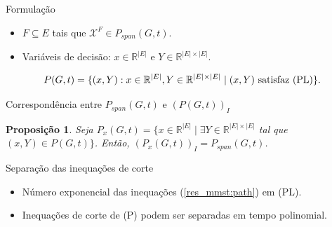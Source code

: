 \documentclass[dvipsnames]{beamer}
\newtheorem{proposicao}{Proposição}
\newcommand{\incid}{\mathcal{X}}
\newcommand{\espacoX}{\mathbb{R}^{|E|}}
\newcommand{\espacoY}{\mathbb{R}^{|E| \times |E|}}
\newcommand{\PGtrestricoes}{\rm{(PL)}}
\begin{document}
\begin{frame}{Formulação}
  \begin{itemize}
  \item $F\subseteq E$ tais que $\incid^{F} \in P_{span}(G,t)$.
    \item Variáveis de decisão: $x \in \espacoX$ e $Y \in \espacoY$.
  \end{itemize}

{\small
\begin{lpformulation}[\PGtrestricoes]
\end{lpformulation}
}

$$P(G,t)= \{(x, Y): x \in \espacoX, Y \in \espacoY\; |\; (x,Y) \text{ satisfaz } \PGtrestricoes\}.$$
  
\end{frame}


\begin{frame}{Correspondência entre $P_{span}(G,t)$ e $(P(G,t))_{I}$}
\begin{proposicao}
Seja $P_{x}(G,t) = \{x \in \espacoX\; |\; \exists Y \in \espacoY$ tal que 
$(x,Y) \in P(G,t)\}$. Então, $(P_{x}(G,t))_{I} = P_{span}(G,t)$.
\end{proposicao}
  \end{frame}

\begin{frame}{Separação das inequações de corte}
\begin{lpformulation}[(P)]
\end{lpformulation}
  
  \begin{itemize}
  \item Número exponencial das inequações (\ref{res_mmst:path}) em \PGtrestricoes.
    \item Inequações de corte de (P) podem ser separadas em tempo polinomial.
    \end{itemize}
  \end{frame}
\end{document}
